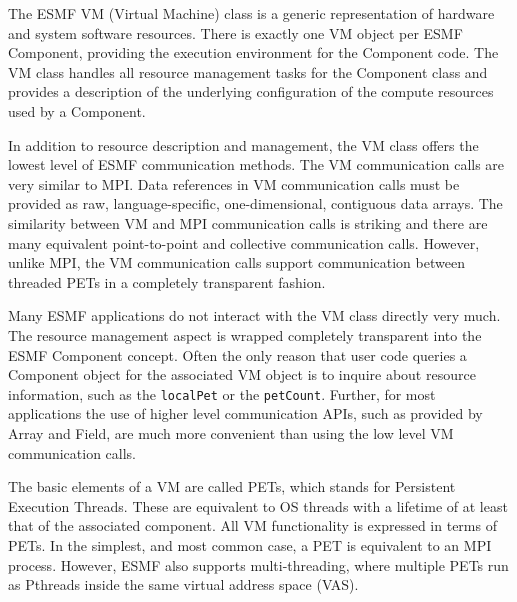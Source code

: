%


The ESMF VM (Virtual Machine) class is a generic representation of hardware and system software resources. There is exactly one VM object per ESMF Component, providing the execution environment for the Component code. The VM class handles all resource management tasks for the Component class and provides a description of the underlying configuration of the compute resources used by a Component.

In addition to resource description and management, the VM class offers the lowest level of ESMF communication methods. The VM communication calls are very similar to MPI. Data references in VM communication calls must be provided as raw, language-specific, one-dimensional, contiguous data arrays. The similarity between VM and MPI communication calls is striking and there are many equivalent point-to-point and collective communication calls. However, unlike MPI, the VM communication calls support communication between threaded PETs in a completely transparent fashion.

Many ESMF applications do not interact with the VM class directly very much. The  resource management aspect is wrapped completely transparent into the ESMF Component concept. Often the only reason that user code queries a Component
object for the associated VM object is to inquire about resource information, such as the {\tt localPet} or the {\tt petCount}. Further, for most applications the use of higher level communication APIs, such as provided by Array and Field, are much more convenient than using the low level VM communication calls.

The basic elements of a VM are called PETs, which stands for Persistent Execution Threads. These are equivalent to OS threads with a lifetime of at least that of the associated component. All VM functionality is expressed in terms of PETs. In the simplest, and most common case, a PET is equivalent to an MPI process. However, ESMF also supports multi-threading, where multiple PETs run as Pthreads inside the same virtual address space (VAS).
